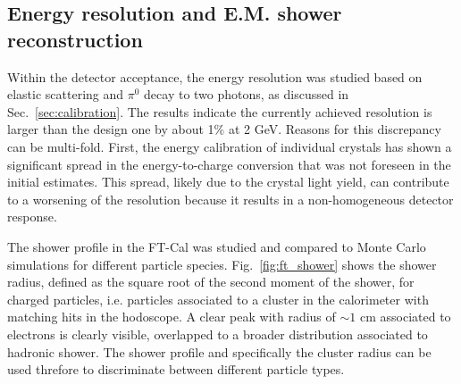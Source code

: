 \subsection{Energy resolution and E.M. shower reconstruction}
Within the detector acceptance, the energy resolution was studied based on elastic scattering and $\pi^0$ decay to two photons, as discussed in Sec.~\ref{sec:calibration}. The results indicate the currently achieved resolution is larger than the design one by about 1\% at 2 GeV. Reasons for this discrepancy can be multi-fold. First, the energy calibration of individual crystals has shown a significant spread in the energy-to-charge conversion that was not foreseen in the initial estimates. This spread, likely due to the crystal light yield, can contribute to a worsening of the resolution because it results in a non-homogeneous detector response. 

The shower profile in the FT-Cal was studied and compared to Monte Carlo simulations for different particle species. Fig.~\ref{fig:ft_shower} shows the shower radius, defined as the square root of the second moment of the shower, for charged particles, i.e. particles associated to a cluster in the calorimeter with matching hits in the hodoscope. A clear peak with radius of $\sim 1$ cm associated to electrons is clearly visible, overlapped to a broader distribution associated to hadronic shower. The shower profile and specifically the cluster radius can be used threfore to discriminate between different particle types.

